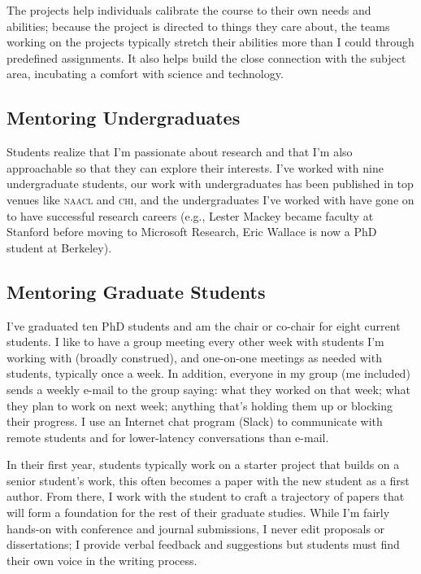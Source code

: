 \documentclass[11pt]{amsart}
\newcommand{\abr}[1]{\textsc{#1}}
\begin{document}
The projects help individuals calibrate the course to their own needs
and abilities; because the project is directed to things they
care about, the teams working on the projects typically stretch their
abilities more than I could through predefined assignments.  It also
helps build the close connection with the subject area, incubating a
comfort with science and technology.

\subsection{Mentoring Undergraduates}

Students realize that I'm passionate about research and that I'm also
approachable so that they can explore their interests. I've worked with nine
undergraduate students, our work with undergraduates has been published in top
venues like \abr{naacl} and \abr{chi}, and the undergraduates I've worked with
have gone on to have successful research careers (e.g., Lester Mackey became
faculty at Stanford before moving to Microsoft Research, Eric Wallace is now a
PhD student at Berkeley).

\subsection{Mentoring Graduate Students}

I've graduated ten PhD students and am the chair or co-chair for
eight current students.  I like to have a group meeting every other
week with students I'm working with (broadly construed), and
one-on-one meetings as needed with students, typically once a week. In
addition, everyone in my group (me included) sends a weekly e-mail to
the group saying: what they worked on that week; what they plan to work
on next week; anything that's holding them up or blocking their
progress. I use an Internet chat program (Slack) to communicate with remote
students and for lower-latency conversations than e-mail.

In their first year, students typically work on a starter project that
builds on a senior student's work, this often becomes a paper with the
new student as a first author.  From there, I work with the student to
craft a trajectory of papers that will form a foundation for the rest
of their graduate studies.  While I'm fairly hands-on with conference
and journal submissions, I never edit proposals or dissertations; I
provide verbal feedback and suggestions but students must find their
own voice in the writing process.
\end{document}
